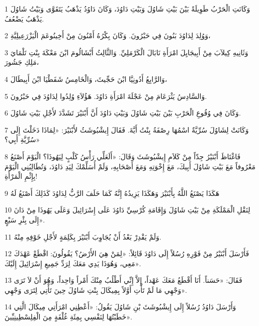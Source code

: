 \par 1 وَكَانَتِ الْحَرْبُ طَوِيلَةً بَيْنَ بَيْتِ شَاوُلَ وَبَيْتِ دَاوُدَ، وَكَانَ دَاوُدُ يَذْهَبُ يَتَقَوَّى وَبَيْتُ شَاوُلَ يَذْهَبُ يَضْعُفُ.
\par 2 وَوُلِدَ لِدَاوُدَ بَنُونَ فِي حَبْرُونَ. وَكَانَ بِكْرُهُ أَمْنُونَ مِنْ أَخِينُوعَمَ الْيَزْرَعِيلِيَّةِ،
\par 3 وَثَانِيهِ كِيلآبَ مِنْ أَبِيجَايِلَ امْرَأَةِ نَابَالَ الْكَرْمَلِيِّ. وَالثَّالِثُ أَبْشَالُومَ ابْنَ مَعْكَةَ بِنْتِ تَلْمَايَ مَلِكِ جَشُورَ،
\par 4 وَالرَّابِعُ أَدُونِيَّا ابْنَ حَجِّيثَ، وَالْخَامِسُ شَفَطْيَا ابْنَ أَبِيطَالَ،
\par 5 وَالسَّادِسُ يَثْرَعَامَ مِنْ عَجْلَةَ امْرَأَةِ دَاوُدَ. هَؤُلاَءِ وُلِدُوا لِدَاوُدَ فِي حَبْرُونَ.
\par 6 وَكَانَ فِي وُقُوعِ الْحَرْبِ بَيْنَ بَيْتِ شَاوُلَ وَبَيْتِ دَاوُدَ أَنَّ أَبْنَيْرَ تَشَدَّدَ لأَجْلِ بَيْتِ شَاوُلَ.
\par 7 وَكَانَتْ لِشَاوُلَ سُرِّيَّةٌ اسْمُهَا رِصْفَةُ بِنْتُ أَيَّةَ. فَقَالَ إِيشْبُوشَثُ لأَبْنَيْرَ: «لِمَاذَا دَخَلْتَ إِلَى سُرِّيَّةِ أَبِي؟»
\par 8 فَاغْتَاظَ أَبْنَيْرُ جِدّاً مِنْ كَلاَمِ إِيشْبُوشَثَ وَقَالَ: «أَلَعَلِّي رَأْسُ كَلْبٍ لِيَهُوذَا؟ الْيَوْمَ أَصْنَعُ مَعْرُوفاً مَعَ بَيْتِ شَاوُلَ أَبِيكَ، مَعَ إِخْوَتِهِ وَمَعَ أَصْحَابِهِ، وَلَمْ أُسَلِّمْكَ لِيَدِ دَاوُدَ، وَتُطَالِبُنِي الْيَوْمَ بِإِثْمِ الْمَرْأَةِ!
\par 9 هَكَذَا يَصْنَعُ اللَّهُ بِأَبْنَيْرَ وَهَكَذَا يَزِيدُهُ إِنَّهُ كَمَا حَلَفَ الرَّبُّ لِدَاوُدَ كَذَلِكَ أَصْنَعُ لَهُ
\par 10 لِنَقْلِ الْمَمْلَكَةِ مِنْ بَيْتِ شَاوُلَ وَإِقَامَةِ كُرْسِيِّ دَاوُدَ عَلَى إِسْرَائِيلَ وَعَلَى يَهُوذَا مِنْ دَانَ إِلَى بِئْرِ سَبْعٍ».
\par 11 وَلَمْ يَقْدِرْ بَعْدُ أَنْ يُجَاوِبَ أَبْنَيْرَ بِكَلِمَةٍ لأَجْلِ خَوْفِهِ مِنْهُ.
\par 12 فَأَرْسَلَ أَبْنَيْرُ مِنْ فَوْرِهِ رُسُلاً إِلَى دَاوُدَ قَائِلاً: «لِمَنْ هِيَ الأَرْضُ؟ يَقُولُونَ: اقْطَعْ عَهْدَكَ مَعِي، وَهُوَذَا يَدِي مَعَكَ لِرَدِّ جَمِيعِ إِسْرَائِيلَ إِلَيْكَ».
\par 13 فَقَالَ: «حَسَناً. أَنَا أَقْطَعُ مَعَكَ عَهْداً، إِلاَّ إِنِّي أَطْلُبُ مِنْكَ أَمْراً وَاحِداً، وَهُوَ أَنْ لاَ تَرَى وَجْهِي مَا لَمْ تَأْتِ أَوَّلاً بِمِيكَالَ بِنْتِ شَاوُلَ حِينَ تَأْتِي لِتَرَى وَجْهِي».
\par 14 وَأَرْسَلَ دَاوُدُ رُسُلاً إِلَى إِيشْبُوشَثَ بْنِ شَاوُلَ يَقُولُ: «أَعْطِنِي امْرَأَتِي مِيكَالَ الَّتِي خَطَبْتُهَا لِنَفْسِي بِمِئَةِ غُلْفَةٍ مِنَ الْفِلِسْطِينِيِّينَ».
